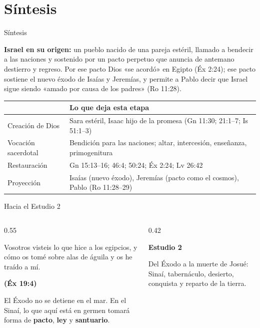 \documentclass[hyperref={bookmarks=false},aspectratio=169]{beamer}
\newcommand{\fuente}[1]{\par\hfill{\upshape\bfseries\footnotesize\textcolor{ladrillo}{#1}}}
\newcommand{\destacar}[1]{\textbf{\textcolor{ladrillo}{#1}}}
\newcommand{\notafig}[1]{\par\vspace{2pt}{\fontsize{5}{6}\selectfont\color{sepia}\hfill\textit{Nota.} #1\par}}
\newcommand{\elabpropia}{\notafig{Elaboración propia.}}
\begin{document}
\section{Síntesis}
\begin{frame}{Síntesis}
\begin{tcolorbox}[colback=piedra,colframe=ladrillo,boxrule=1pt,arc=3pt,fontupper=\small]
\textbf{\textcolor{cafe}{Israel en su origen:}} un pueblo nacido de una pareja estéril, llamado a bendecir a las naciones y sostenido por un pacto perpetuo que anuncia de antemano destierro y regreso. Por ese pacto Dios «se acordó» en Egipto (Éx 2:24); ese pacto sostiene el nuevo éxodo de Isaías y Jeremías, y permite a Pablo decir que Israel sigue siendo «amado por causa de los padres» (Ro 11:28).
\end{tcolorbox}
\scriptsize\renewcommand{\arraystretch}{1.25}
\begin{tabular}{>{\RaggedRight\arraybackslash}p{3.0cm}>{\RaggedRight\arraybackslash}p{8.6cm}}
\toprule
{\leavevmode\color{ladrillo}\bfseries Eje} & {\leavevmode\color{ladrillo}\bfseries Lo que deja esta etapa}\\\midrule
Creación de Dios & Sara estéril, Isaac hijo de la promesa (Gn 11:30; 21:1--7; Is 51:1--3)\\
Vocación sacerdotal & Bendición para las naciones; altar, intercesión, enseñanza, primogenitura\\
Restauración & Gn 15:13--16; 46:4; 50:24; Éx 2:24; Lv 26:42\\
Proyección & Isaías (nuevo éxodo), Jeremías (pacto como el cosmos), Pablo (Ro 11:28--29)\\
\bottomrule
\end{tabular}
\elabpropia
\end{frame}

\begin{frame}{Hacia el Estudio 2}
\begin{columns}[c,onlytextwidth]
\begin{column}{0.55\textwidth}
\begin{cita}Vosotros visteis lo que hice a los egipcios, y cómo os tomé sobre alas de águila y os he traído a mí.\fuente{(Éx 19:4)}\end{cita}
\small El Éxodo no se detiene en el mar. En el Sinaí, lo que aquí está en germen tomará forma de \destacar{pacto}, \destacar{ley} y \destacar{santuario}.
\end{column}
\begin{column}{0.42\textwidth}
\begin{tcolorbox}[colback=cafe,colframe=cafeosc,coltext=piedra,boxrule=0.8pt,arc=3pt,fontupper=\small]
\textbf{Estudio 2}\par\smallskip
Del Éxodo a la muerte de Josué: Sinaí, tabernáculo, desierto, conquista y reparto de la tierra.
\end{tcolorbox}
\end{column}
\end{columns}
\end{frame}
\end{document}
